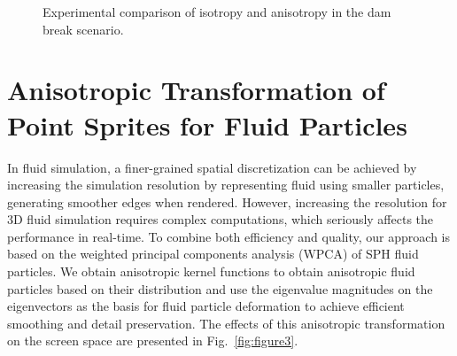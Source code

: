 \documentclass[times,twocolumn,final]{elsarticle}
\begin{document}
\begin{figure}[b!]
    \centering
    \hspace{-7pt}
    \caption{Experimental comparison of isotropy and anisotropy in the dam break scenario.}
    \label{fig:figure4}
\end{figure}

\section{Anisotropic Transformation of Point Sprites for Fluid Particles}

In fluid simulation, a finer-grained spatial discretization can be achieved by increasing the simulation resolution by representing fluid using smaller particles, generating smoother edges when rendered. However, increasing the resolution for 3D fluid simulation requires complex computations, which seriously affects the performance in real-time. To combine both efficiency and quality, our approach is based on the weighted principal components analysis (WPCA) of SPH fluid particles. We obtain anisotropic kernel functions to obtain anisotropic fluid particles based on their distribution and use the eigenvalue magnitudes on the eigenvectors as the basis for fluid particle deformation to achieve efficient smoothing and detail preservation. The effects of this anisotropic transformation on the screen space are presented in Fig.~\ref{fig:figure3}.
\end{document}
